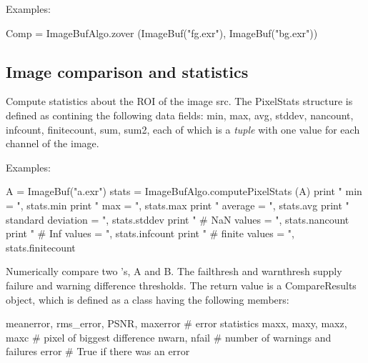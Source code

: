 \smallskip
\noindent Examples:
\begin{code}
    Comp = ImageBufAlgo.zover (ImageBuf("fg.exr"), ImageBuf("bg.exr"))
\end{code}
\apiend



\subsection{Image comparison and statistics}
\label{sec:iba:py:stats}


 

Compute statistics about the ROI of the image {\cf src}.
The {\cf PixelStats} structure is defined as contining the following
data fields: {\cf min}, {\cf max}, {\cf avg}, {\cf stddev},
{\cf nancount}, {\cf infcount}, {\cf finitecount}, {\cf sum}, {\cf sum2},
each of which is a \emph{tuple} with one value for each channel of the image.

\smallskip
\noindent Examples:
\begin{code}
    A = ImageBuf("a.exr")
    stats = ImageBufAlgo.computePixelStats (A)
    print "   min = ", stats.min
    print "   max = ", stats.max
    print "   average = ", stats.avg
    print "   standard deviation  = ", stats.stddev
    print "   # NaN values    = ", stats.nancount
    print "   # Inf values    = ", stats.infcount
    print "   # finite values = ", stats.finitecount
\end{code}
\apiend


 

Numerically compare two \ImageBuf's, {\cf A} and {\cf B}. The {\cf failthresh}
and {\cf warnthresh} supply failure and warning difference thresholds.
The return value is a {\cf CompareResults} object,
which is defined as a class having the following members:
\begin{code}
    meanerror, rms_error, PSNR, maxerror  # error statistics
    maxx, maxy, maxz, maxc                # pixel of biggest difference
    nwarn, nfail                          # number of warnings and failures
    error                                 # True if there was an error
\end{code}

